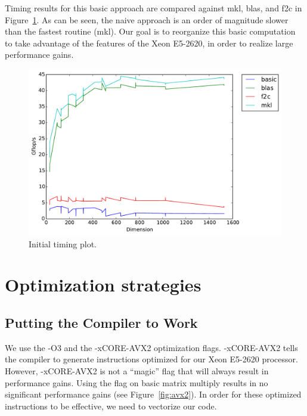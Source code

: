 \documentclass[fontsize=11pt]{scrartcl}
\numberwithin{equation}{section}        %
\numberwithin{figure}{section}          %
\numberwithin{table}{section}               %
\begin{document}
Timing results for this basic approach are compared against mkl, blas, and f2c
in Figure~\ref{fig:initial}. As can be seen, the naive approach is an order of 
magnitude slower than the fastest routine (mkl).  Our goal is to reorganize this
basic computation to take advantage of the features of the Xeon E5-2620, in order
to realize large performance gains.

\begin{figure}[h]
    \centering
    \includegraphics[width=5.0in]{../final_timings/timing_initial.pdf}
    \caption{Initial timing plot.}
    \label{fig:initial}
\end{figure}


\section{Optimization strategies}

\subsection{Putting the Compiler to Work}

We use the -O3 and the -xCORE-AVX2 optimization flags.  -xCORE-AVX2 tells the 
compiler to generate instructions optimized for our Xeon E5-2620 processor.  
However, -xCORE-AVX2 is not a ``magic'' flag that will always result in
performance gains.  Using the flag on basic matrix multiply results in no
significant performance gains (see Figure~\ref{fig:avx2}).  In order for these
optimized instructions to be effective, we need to vectorize our code.
\end{document}
